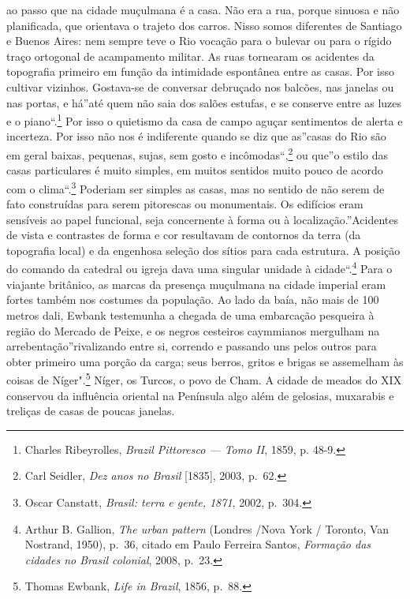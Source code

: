 ao passo que na cidade muçulmana é a casa. Não era a rua, porque sinuosa
e não planificada, que orientava o trajeto dos carros. Nisso somos
diferentes de Santiago e Buenos Aires: nem sempre teve o Rio vocação
para o bulevar ou para o rígido traço ortogonal de acampamento militar.
As ruas tornearam os acidentes da topografia primeiro em função da
intimidade espontânea entre as casas. Por isso cultivar vizinhos.
Gostava-se de conversar debruçado nos balcões, nas janelas ou nas
portas, e há''até quem não saia dos salões estufas, e se conserve entre
as luzes e o piano``.\footnote{Charles Ribeyrolles, \textit{Brazil
  Pittoresco --- Tomo II}, 1859, p. 48-9.} Por isso o quietismo da casa
de campo aguçar sentimentos de alerta e incerteza. Por isso não nos é
indiferente quando se diz que as''casas do Rio são em geral baixas,
pequenas, sujas, sem gosto e incômodas``,\footnote{Carl Seidler,
  \textit{Dez anos no Brasil} {[}1835{]}, 2003, p.~62.} ou que''o estilo
das casas particulares é muito simples, em muitos sentidos muito pouco
de acordo com o clima``.\footnote{Oscar Canstatt, \textit{Brasil: terra e
  gente, 1871}, 2002, p.~304.} Poderiam ser simples as casas, mas no
sentido de não serem de fato construídas para serem pitorescas ou
monumentais. Os edifícios eram sensíveis ao papel funcional, seja
concernente à forma ou à localização.''Acidentes de vista e contrastes
de forma e cor resultavam de contornos da terra (da topografia local) e
da engenhosa seleção dos sítios para cada estrutura. A posição do
comando da catedral ou igreja dava uma singular unidade à
cidade``.\footnote{Arthur B. Gallion, \textit{The urban pattern} (Londres
  /Nova York / Toronto, Van Nostrand, 1950), p.~36, citado em Paulo
  Ferreira Santos, \textit{Formação das cidades no Brasil colonial}, 2008,
  p.~23.} Para o viajante britânico, as marcas da presença muçulmana na
cidade imperial eram fortes também nos costumes da população. Ao lado da
baía, não mais de 100 metros dali, Ewbank testemunha a chegada de uma
embarcação pesqueira à região do Mercado de Peixe, e os negros cesteiros
caymmianos mergulham na arrebentação''rivalizando entre si, correndo e
passando uns pelos outros para obter primeiro uma porção da carga; seus
berros, gritos e brigas se assemelham às coisas de Níger".\footnote{Thomas
  Ewbank, \textit{Life in Brazil}, 1856, p.~88.} Níger, os Turcos, o povo
de Cham. A cidade de meados do XIX conservou da influência oriental na
Península algo além de gelosias, muxarabis e treliças de casas de poucas
janelas.


